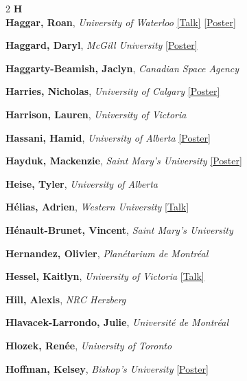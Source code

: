 \begin{small}
\begin{multicols}{2}
{\sffamily\bfseries\color{cascablue}\large H}\\[2pt]

\textbf{Haggar, Roan}, {\footnotesize\textit{University of Waterloo}} \hyperref[abstract-page-talk-211]{\scriptsize\textcolor{cascablue}{[Talk]}} \hyperref[poster-abstract-page-talk-202]{\scriptsize\textcolor{cascateal}{[Poster]}}\par
\textbf{Haggard, Daryl}, {\footnotesize\textit{McGill University}} \hyperref[poster-abstract-page-talk-120]{\scriptsize\textcolor{cascateal}{[Poster]}}\par
\textbf{Haggarty-Beamish, Jaclyn}, {\footnotesize\textit{Canadian Space Agency}}\par
\textbf{Harries, Nicholas}, {\footnotesize\textit{University of Calgary}} \hyperref[poster-abstract-page-talk-282]{\scriptsize\textcolor{cascateal}{[Poster]}}\par
\textbf{Harrison, Lauren}, {\footnotesize\textit{University of Victoria}}\par
\textbf{Hassani, Hamid}, {\footnotesize\textit{University of Alberta}} \hyperref[poster-abstract-page-talk-252]{\scriptsize\textcolor{cascateal}{[Poster]}}\par
\textbf{Hayduk, Mackenzie}, {\footnotesize\textit{Saint Mary's University}} \hyperref[poster-abstract-page-talk-150]{\scriptsize\textcolor{cascateal}{[Poster]}}\par
\textbf{Heise, Tyler}, {\footnotesize\textit{University of Alberta}}\par
\textbf{Hélias, Adrien}, {\footnotesize\textit{Western University}} \hyperref[abstract-page-talk-193]{\scriptsize\textcolor{cascablue}{[Talk]}}\par
\textbf{Hénault-Brunet, Vincent}, {\footnotesize\textit{Saint Mary's University}}\par
\textbf{Hernandez, Olivier}, {\footnotesize\textit{Planétarium de Montréal}}\par
\textbf{Hessel, Kaitlyn}, {\footnotesize\textit{University of Victoria}} \hyperref[abstract-page-talk-194]{\scriptsize\textcolor{cascablue}{[Talk]}}\par
\textbf{Hill, Alexis}, {\footnotesize\textit{NRC Herzberg}}\par
\textbf{Hlavacek-Larrondo, Julie}, {\footnotesize\textit{Université de Montréal}}\par
\textbf{Hlozek, Renée}, {\footnotesize\textit{University of Toronto}}\par
\textbf{Hoffman, Kelsey}, {\footnotesize\textit{Bishop's University}} \hyperref[poster-abstract-page-talk-186]{\scriptsize\textcolor{cascateal}{[Poster]}}\par

\end{multicols}
\end{small}

